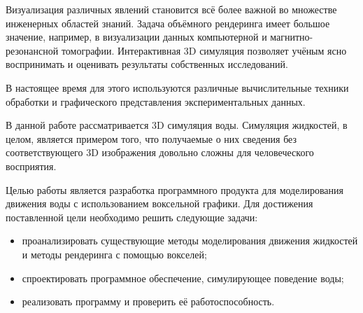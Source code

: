 \Introduction

Визуализация различных явлений становится всё более важной во множестве инженерных
областей знаний.
Задача объёмного рендеринга имеет большое значение, например, в визуализации данных
компьютерной и магнитно-резонансной томографии\cite{book:ash}.
Интерактивная 3D симуляция позволяет учёным ясно воспринимать и
оценивать результаты собственных исследований.

В настоящее время для этого используются различные вычислительные техники обработки
 и графического представления экспериментальных данных\cite{book:physical}.

В данной работе рассматривается 3D симуляция воды. Симуляция жидкостей, в целом,
является примером того, что получаемые о них сведения без соответствующего 3D изображения
довольно сложны для человеческого восприятия.

Целью работы является разработка программного продукта для моделирования движения воды с использованием воксельной графики. Для достижения поставленной цели необходимо решить следующие задачи:

\begin{itemize}
\item проанализировать существующие методы моделирования движения жидкостей и методы рендеринга с помощью вокселей;
\item спроектировать программное обеспечение, симулирующее поведение воды;
\item реализовать программу и проверить её работоспособность.
\end{itemize}
